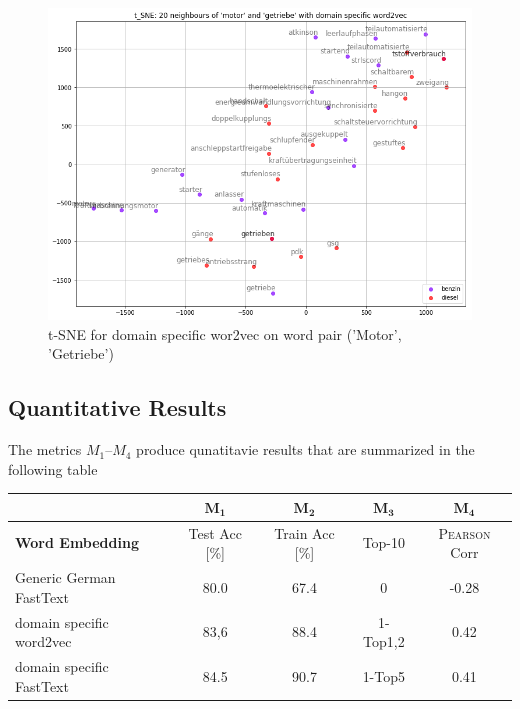 \documentclass[10pt,a4paper]{article}
\begin{document}
\begin{figure}
	\begin{center}
		\includegraphics[scale=0.4]{./Pictures/model_ds_w2v_motor_getriebe.png}
		\caption{t-SNE for domain specific wor2vec on word pair ('Motor', 'Getriebe')}
	\end{center}	
\end{figure}

\subsection{Quantitative Results}
\label{quant}
	The metrics \textbf{$M_1$}--\textbf{$M_4$} produce qunatitavie results that are summarized in the following table 
	
	\begin{center}
		\begin{tabular}{|l| c| c| c|c|}
			
			\hline
			
			 & $\boldsymbol{M_1}$ & $\boldsymbol{M_2}$ & $\boldsymbol{M_3}$ & $\boldsymbol{M_4}$\\ \hline
			
			\textbf{Word Embedding} & Test Acc [\%]& Train Acc [\%] & Top-10 & \textsc{Pearson} Corr \\ \hline
		    Generic German FastText   & 80.0 & 67.4 & 0 & -0.28\\  \hline
			
			domain specific word2vec  & 83,6 & 88.4 & 1-Top1,2 & 0.42\\  \hline
			
			domain specific FastText  & 84.5 & 90.7 & 1-Top5  & 0.41\\ \hline 
		
		\end{tabular}
	\end{center}
\end{document}
